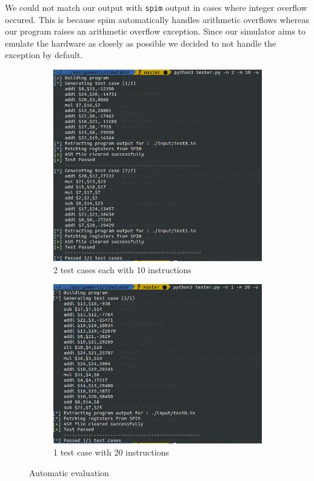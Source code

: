 \documentclass[hidelinks,12pt]{article}
\begin{document}
We could not match our output with \verb|spim| output in cases where integer overflow occured. This is because spim automatically handles arithmetic overflows whereas our program raises an arithmetic overflow exception.
Since our simulator aims to emulate the hardware as closely as possible we decided to not handle the exception by default.
\begin{figure}[H]
    \centering
    \begin{subfigure}[t]{\textwidth}
        \centering
        \includegraphics[scale=0.4]{n2_m10.png}
        \caption{2 test cases each with 10 instructions}
    \end{subfigure}
    \begin{subfigure}[t]{\textwidth}
        \centering
        \includegraphics[scale=0.4]{n1_m20.png}
        \caption{1 test case with 20 instructions}
    \end{subfigure}
    \caption{Automatic evaluation}
\end{figure}
\end{document}
